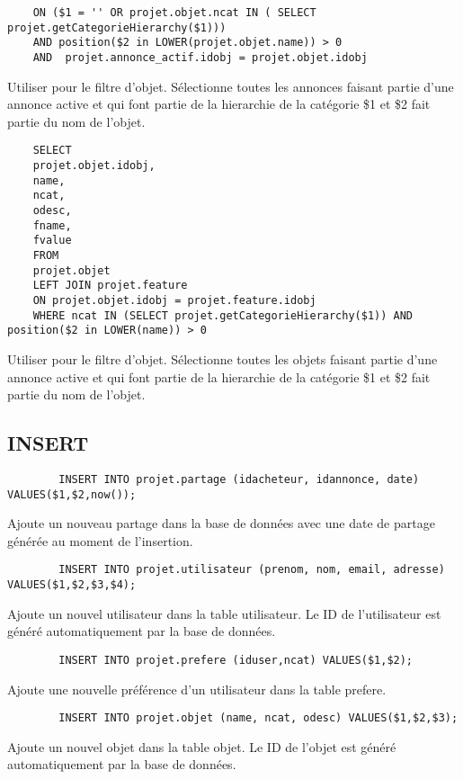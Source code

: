 \documentclass[a4paper,12pt]{article}
\begin{document}
\begin{spacing}{1}
\begin{verbatim}
	ON ($1 = '' OR projet.objet.ncat IN ( SELECT projet.getCategorieHierarchy($1))) 
	AND position($2 in LOWER(projet.objet.name)) > 0 
	AND  projet.annonce_actif.idobj = projet.objet.idobj
	\end{verbatim}
	Utiliser pour le filtre d'objet. Sélectionne toutes les annonces faisant partie d'une annonce active et qui font partie de la hierarchie de la catégorie \$1 et \$2 fait partie du nom de l'objet.
	\begin{verbatim}
	SELECT 
	projet.objet.idobj,
	name,
	ncat,
	odesc,
	fname,
	fvalue 
	FROM 
	projet.objet 
	LEFT JOIN projet.feature 
	ON projet.objet.idobj = projet.feature.idobj 
	WHERE ncat IN (SELECT projet.getCategorieHierarchy($1)) AND position($2 in LOWER(name)) > 0		
	\end{verbatim}
	Utiliser pour le filtre d'objet. Sélectionne toutes les objets faisant partie d'une annonce active et qui font partie de la hierarchie de la catégorie \$1 et \$2 fait partie du nom de l'objet.
    \subsection*{INSERT}
    
    \begin{verbatim}
        INSERT INTO projet.partage (idacheteur, idannonce, date) VALUES($1,$2,now());
    \end{verbatim}
    Ajoute un nouveau partage dans la base de données avec une date de partage générée au moment de l'insertion.
    
    \begin{verbatim}
        INSERT INTO projet.utilisateur (prenom, nom, email, adresse) VALUES($1,$2,$3,$4);
    \end{verbatim}
    Ajoute un nouvel utilisateur dans la table utilisateur. Le ID de l'utilisateur est généré automatiquement par la base de données. 

    \begin{verbatim}
        INSERT INTO projet.prefere (iduser,ncat) VALUES($1,$2);
    \end{verbatim}
    Ajoute une nouvelle préférence d'un utilisateur dans la table prefere.
    
    \begin{verbatim}
        INSERT INTO projet.objet (name, ncat, odesc) VALUES($1,$2,$3);
    \end{verbatim}
    Ajoute un nouvel objet dans la table objet. Le ID de l'objet est généré automatiquement par la base de données.
    

\end{spacing}
\end{document}
